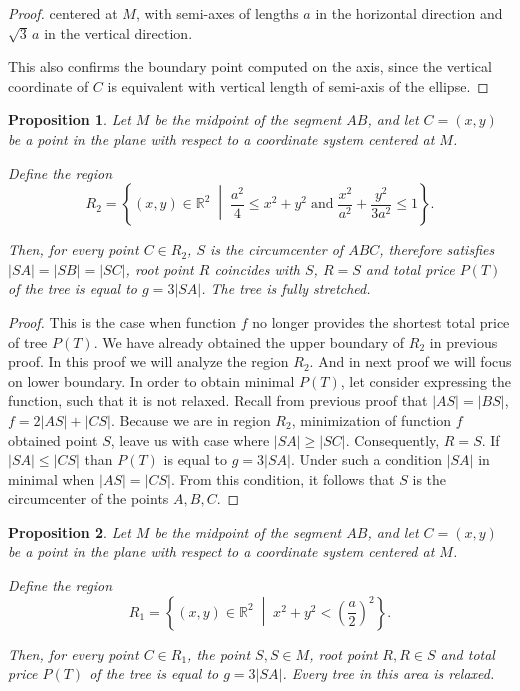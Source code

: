 \documentclass[openany]{book}
\newcommand{\Ptotal}[1]{P(#1)}
\newtheorem{proposition}{Proposition}
\begin{document}
\begin{proof}
	centered at \( M \), with semi-axes of lengths \( a \) in the horizontal direction and \( \sqrt{3}\,a \) in the vertical direction.
	
	This also confirms the boundary point computed on the axis, since the vertical coordinate of \( C \) is equivalent with vertical length of semi-axis of the ellipse.
	\end{proof}
	
	\begin{proposition}\label{prop:R2}
		Let \( M \) be the midpoint of the segment \( AB \), and let \( C = (x,y) \) be a point in the plane with respect to a coordinate system centered at \( M \).
		
		Define the region
		\[
		R_2 = \left\{ (x,y) \in \mathbb{R}^2 \;\middle|\;
		\frac{a^2}{4} \le x^2 + y^2 \;\text{and}\;
		\frac{x^2}{a^2} + \frac{y^2}{3a^2} \le 1
		\right\}.
		\]
		
		Then, for every point \( C \in R_2 \), \(S\) is the circumcenter of \(ABC\), therefore satisfies \(|SA|=|SB|=|SC|\), root point \(R\) coincides with \(S\), \( R = S\) and total price \(\Ptotal{T}\) of the tree is equal to \(g = 3|SA|\).  The tree is fully stretched.
	\end{proposition}
	
	\begin{proof}
		This is the case when function \(f\) no longer provides the shortest total price of tree \(P(T)\). We have already obtained the upper boundary of \(R_2\) in previous proof. In this proof we will analyze the region \(R_2\). And in next proof we will focus on lower boundary. In order to obtain minimal \(\Ptotal{T}\), let consider expressing the function, such that it is not relaxed.    
		Recall from previous proof that \(|AS|=|BS|\), \(f = 2|AS| + |CS|\). Because we are in region \(R_2\), minimization of function \(f\) obtained point \(S\), leave us with case where \(|SA|\geq|SC|\). Consequently, \(R=S\).
		If \(|SA|\leq|CS|\) than \(\Ptotal{T}\) is equal to \(g = 3|SA|\). Under such a condition \(|SA|\) in minimal when \(|AS| = |CS|\). From this condition, it follows that \(S\) is the circumcenter of the points \(A, B, C\). 	
	\end{proof}
	
	\begin{proposition}\label{prop:R1}
		Let \( M \) be the midpoint of the segment \( AB \), and let \( C = (x,y) \) be a point in the plane with respect to a coordinate system centered at \( M \).
		
		Define the region
		\[
		R_1 = \left\{ (x,y) \in \mathbb{R}^2 \;\middle|\; x^2 + y^2 < (\frac{a}{2})^2 \right\}.
		\]
		
		Then, for every point \( C \in R_1 \), the point \(S, S \in M\), root point \(R, R \in S\) and total price \(\Ptotal{T}\) of the tree is equal to \(g = 3|SA| \). 
		Every tree in this area is relaxed.  
	\end{proposition}
\end{document}
